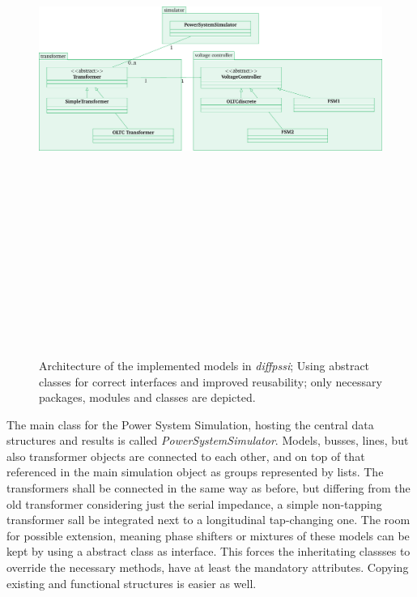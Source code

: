 \begin{figure}[htbp!]
        \centering
        \includegraphics[angle=90, height=18cm]{./tikz_graphics/images/software_structure.pdf}%
        \caption[Architecture of the implemented models in \textit{diffpssi}]{Architecture of the implemented models in \textit{diffpssi}; Using abstract classes for correct interfaces and improved reusability; only necessary packages, modules and classes are depicted.}
        \label{fig:transformer-architecture}
\end{figure}

The main class for the Power System Simulation, hosting the central data structures and results is called \textit{PowerSystemSimulator}.
Models, busses, lines, but also transformer objects are connected to each other, and on top of that referenced in the main simulation object as groups represented by lists.
The transformers shall be connected in the same way as before, but differing from the old transformer considering just the serial impedance, a simple non-tapping transformer sall be integrated next to a longitudinal tap-changing one.
The room for possible extension, meaning phase shifters or mixtures of these models can be kept by using a abstract class as interface.
This forces the inheritating classses to override the necessary methods, have at least the mandatory attributes.
Copying existing and functional structures is easier as well.


